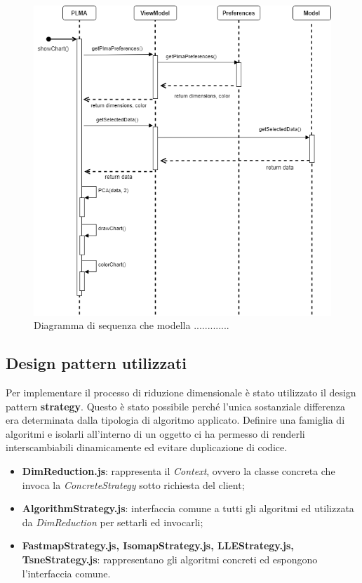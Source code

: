 \newpage
\begin{figure}[hb]
\includegraphics[width=15.5cm]{Images/Allegato Tecnico-Sequenza-PLMA}
\centering
\caption{Diagramma di sequenza che modella .............}
\end{figure}
\newpage

\subsection{Design pattern utilizzati}
Per implementare il processo di riduzione dimensionale è stato utilizzato il design pattern \textbf{strategy}. Questo è stato possibile perché l'unica sostanziale differenza era determinata dalla tipologia di algoritmo applicato. Definire una famiglia di algoritmi e isolarli all'interno di un oggetto ci ha permesso di renderli interscambiabili dinamicamente ed evitare duplicazione di codice. 
\begin{itemize}
\item \textbf{DimReduction.js}: rappresenta il \textit{Context}, ovvero la classe concreta che invoca la \textit{ConcreteStrategy} sotto richiesta del client;
\item \textbf{AlgorithmStrategy.js}: interfaccia comune a tutti gli algoritmi ed utilizzata da \textit{DimReduction} per settarli ed invocarli;
\item \textbf{FastmapStrategy.js, IsomapStrategy.js, LLEStrategy.js, TsneStrategy.js}: rappresentano gli algoritmi concreti ed espongono l'interfaccia comune.
\end{itemize}

